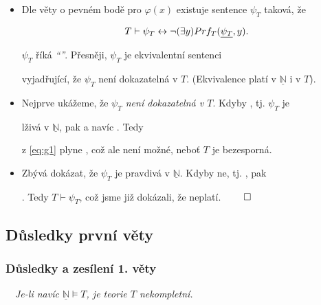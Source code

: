     \begin{itemize}
    \item Dle věty o pevném bodě pro $\varphi(x)$ existuje sentence $\psi_T$ taková, že
    
    \begin{equation}\label{eq:g1}
    {T\vdash \psi_T \leftrightarrow \neg (\exists y)Prf_T(\underline{\psi_T},y)}.
    \end{equation}
    
    
    $\psi_T$ říká {\it ``''}. Přesněji,  $\psi_T$ je ekvivalentní sentenci
    \smallskip
    
    vyjadřující, že $\psi_T$ není dokazatelná v $T$. (Ekvivalence platí v $\underline{\mathbb{N}}$ i v $T$).
    \smallskip
    
    \item Nejprve ukážeme, že {\it $\psi_T$ není dokazatelná v $T$}. Kdyby , tj. $\psi_T$ je
    \smallskip
    
    lživá v $\underline{\mathbb{N}}$, pak  a navíc
    . Tedy
    \smallskip
    
    z \eqref{eq:g1} plyne , což ale není možné, neboť $T$ je bezesporná.
    \smallskip
    
    \item Zbývá dokázat, že $\psi_T$ je pravdivá v $\underline{\mathbb{N}}$. Kdyby ne, tj. , pak
    \smallskip
    
    . Tedy $T \vdash \psi_T$, což jsme již dokázali, že neplatí. $\qed$
    \end{itemize}
    



\subsection{Důsledky první věty}\todo

\subsubsection*{Důsledky a zesílení 1. věty}
    \ \ {\it Je-li navíc $\underline{\mathbb{N}}\models T$, je teorie $T$ nekompletní.}
    \medskip
    
